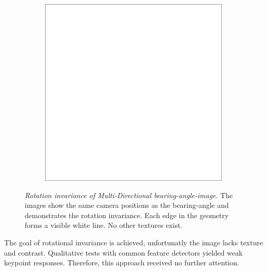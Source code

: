 \begin{figure}[H]
\begin{subfigure}[t]{0.32\textwidth}
    \end{subfigure}
    \begin{subfigure}[t]{0.32\textwidth}
        \includegraphics[width=\linewidth]{chapter04/img/max-0210.png}
    \end{subfigure}
    \caption[Rotation invariance of Multi-Directional \gls{bearing-angle-image}]{\emph{Rotation invariance of Multi-Directional \gls{bearing-angle-image}.} The images show the same camera positions as the \gls{bearing-angle} and demonstrates the rotation invariance. Each edge in the geometry forms a visible white line. No other textures exist.}\label{fig:max-curve-images}
\end{figure}
The goal of rotational invariance is achieved, unfortunatly the image lacks texture and contrast.
Qualitative tests with common feature detectors yielded weak keypoint responses.
Therefore, this approach received no further attention.
